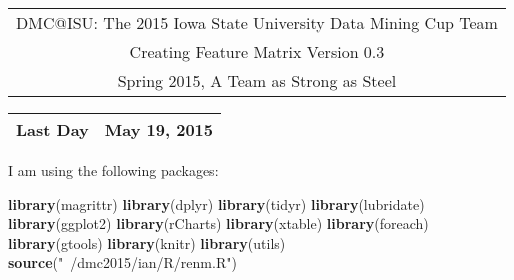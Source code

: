 \documentclass[10pt]{report}
\newenvironment{Shaded}{}{}
\newcommand{\KeywordTok}[1]{\textcolor[rgb]{0.00,0.44,0.13}{\textbf{{#1}}}}
\newcommand{\StringTok}[1]{\textcolor[rgb]{0.25,0.44,0.63}{{#1}}}
\newcommand{\NormalTok}[1]{{#1}}
\begin{document}
\thispagestyle{empty}%
\begin{center}%
    \renewcommand{\arraystretch}{1.5}%
    \begin{tabular}{c}%
       \Large{DMC@ISU: The 2015 Iowa State University Data Mining Cup Team}\\
       Creating Feature Matrix Version 0.3\\
       Spring 2015, A Team as Strong as Steel \\
    \end{tabular}
\end{center}

\begin{center}
 \renewcommand{\arraystretch}{1.5}
 \begin{tabular*}{0.65\textwidth}{r@{:\hspace{.3cm}}l}
    \hline
    
    
    Last Day&  May 19, 2015\\
    \hline
 \end{tabular*}
\end{center}

I am using the following packages:

\begin{Shaded}
\begin{Highlighting}[]
   \KeywordTok{library}\NormalTok{(magrittr)}
   \KeywordTok{library}\NormalTok{(dplyr)}
   \KeywordTok{library}\NormalTok{(tidyr)}
   \KeywordTok{library}\NormalTok{(lubridate)}
   \KeywordTok{library}\NormalTok{(ggplot2)}
   \KeywordTok{library}\NormalTok{(rCharts)}
   \KeywordTok{library}\NormalTok{(xtable)}
   \KeywordTok{library}\NormalTok{(foreach)}
   \KeywordTok{library}\NormalTok{(gtools)}
   \KeywordTok{library}\NormalTok{(knitr)}
   \KeywordTok{library}\NormalTok{(utils)}
   \KeywordTok{source}\NormalTok{(}\StringTok{"~/dmc2015/ian/R/renm.R"}\NormalTok{)}
\end{Highlighting}
\end{Shaded}
\end{document}
